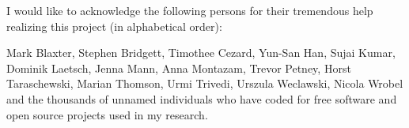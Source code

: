 

\begin{acknowledgements}      %


  I would like to acknowledge the following persons for their
  tremendous help realizing this project (in alphabetical order):

  Mark Blaxter, Stephen Bridgett, Timothee Cezard, Yun-San Han, Sujai
  Kumar, Dominik Laetsch, Jenna Mann, Anna Montazam, Trevor Petney,
  Horst Taraschewski, Marian Thomson, Urmi Trivedi, Urszula Weclawski,
  Nicola Wrobel and the thousands of unnamed individuals who have
  coded for free software and open source projects used in my
  research.

\end{acknowledgements}



